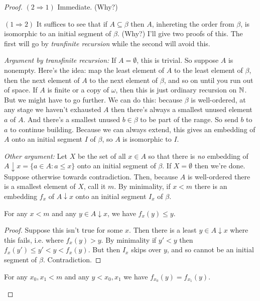 \documentclass[10pt]{amsart}
\begin{document}
\begin{proof}
$(2 \Rightarrow 1)$ Immediate. (Why?)

$(1 \Rightarrow 2)$ It suffices to see that if $A \subseteq \beta$ then $A$, inhereting the order from $\beta$, is isomorphic to an initial segment of $\beta$. (Why?) I'll give two proofs of this. The first will go by \emph{tranfinite recursion} while the second will avoid this.

\textit{Argument by transfinite recursion:}
If $A = \emptyset$, this is trivial. So suppose $A$ is nonempty. Here's the idea: map the least element of $A$ to the least element of $\beta$, then the next element of $A$ to the next element of $\beta$, and so on until you run out of space. If $A$ is finite or a copy of $\omega$, then this is just ordinary recursion on $\mathbb{N}$. But we might have to go further. We can do this: because $\beta$ is well-ordered, at any stage we haven't exhausted $A$ then there's always a smallest unused element $a$ of $A$. And there's a smallest unused $b \in \beta$ to be part of the range. So send $b$ to $a$ to continue building. Because we can always extend, this gives an embedding of $A$ onto an initial segment $I$ of $\beta$, so $A$ is isomorphic to $I$.

\textit{Other argument:} Let $X$ be the set of all $x \in A$ so that there is \emph{no} embedding of $A \downarrow x = \{ a \in A : a \le x \}$ onto an initial segment of $\beta$. If $X = \emptyset$ then we're done. Suppose otherwise towards contradiction. Then, because $A$ is well-ordered there is a smallest element of $X$, call it $m$. By minimality, if $x < m$ there is an embedding $f_x$ of $A \downarrow x$ onto an initial segment $I_x$ of $\beta$.

\begin{claim*}
For any $x < m$ and any $y \in A \downarrow x$, we have $f_x(y) \le y$. 
\end{claim*}

\begin{proof}
Suppose this isn't true for some $x$. Then there is a least $y \in A \downarrow x$ where this fails, i.e. where $f_x(y) > y$. By minimality if $y' < y$ then $f_x(y') \le y' < y < f_x(y)$. But then $I_x$ skips over $y$, and so cannot be an initial segment of $\beta$. Contradiction.
\end{proof}

\begin{claim*}
For any $x_0,x_1 < m$ and any $y < x_0,x_1$ we have $f_{x_0}(y) = f_{x_1}(y)$.
\end{claim*}


\end{proof}
\end{document}
